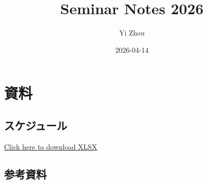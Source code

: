 \documentclass[
]{book}
\title{Seminar Notes 2026}
\author{Yi Zhou}
\date{2026-04-14}
\begin{document}
\maketitle

{
\setcounter{tocdepth}{1}
\tableofcontents
}
\chapter*{資料}\label{ux8cc7ux6599}

\section*{スケジュール}\label{ux30b9ux30b1ux30b8ux30e5ux30fcux30eb}

\href{Schedule2026.xlsx}{Click here to download XLSX}

\section*{参考資料}\label{ux53c2ux8003ux8cc7ux6599}
\end{document}
